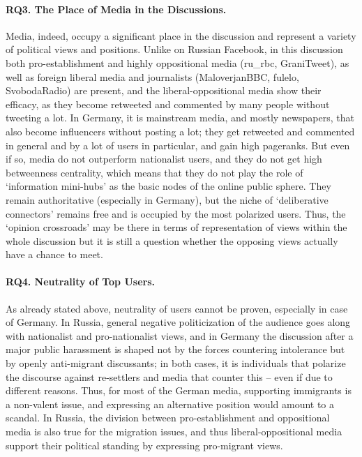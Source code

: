\paragraph{RQ3. The Place of Media in the Discussions.} Media, indeed, occupy a significant place in the discussion and represent a variety of political views and positions. Unlike on Russian Facebook, in this discussion both pro-establishment and highly oppositional media (ru\_rbc, GraniTweet), as well as foreign liberal media and journalists (MaloverjanBBC, fulelo, SvobodaRadio) are present, and the liberal-oppositional media show their efficacy, as they become retweeted and commented by many people without tweeting a lot. In Germany, it is mainstream media, and mostly newspapers, that also become influencers without posting a lot; they get retweeted and commented in general and by a lot of users in particular, and gain high pageranks. But even if so, media do not outperform nationalist users, and they do not get high betweenness centrality, which means that they do not play the role of ‘information mini-hubs’ as the basic nodes of the online public sphere. They remain authoritative (especially in Germany), but the niche of ‘deliberative connectors’ remains free and is occupied by the most polarized users. Thus, the ‘opinion crossroads’ may be there in terms of representation of views within the whole discussion but it is still a question whether the opposing views actually have a chance to meet.

\paragraph{RQ4. Neutrality of Top Users.} As already stated above, neutrality of users cannot be proven, especially in case of Germany. In Russia, general negative politicization of the audience goes along with nationalist and pro-nationalist views, and in Germany the discussion after a major public harassment is shaped not by the forces countering intolerance but by openly anti-migrant discussants; in both cases, it is individuals that polarize the discourse against re-settlers and media that counter this -- even if due to different reasons. Thus, for most of the German media, supporting immigrants is a non-valent issue, and expressing an alternative position would amount to a scandal. In Russia, the division between pro-establishment and oppositional media is also true for the migration issues, and thus liberal-oppositional media support their political standing by expressing pro-migrant views.


